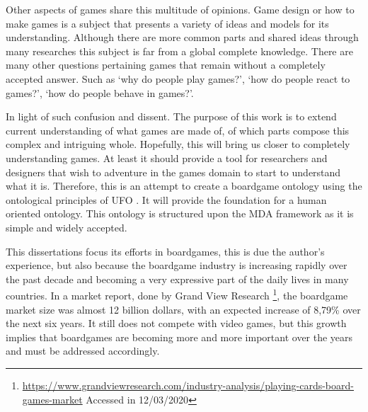 Other aspects of games share this multitude of opinions. Game design or how to make games is a subject that presents a variety of ideas and models for its understanding. Although there are more common parts and shared ideas through many researches this subject is far from a global complete knowledge. There are many other questions pertaining games that remain without a completely accepted answer. Such as `why do people play games?', `how do people react to games?', `how do people behave in games?'.

In light of such confusion and dissent. The purpose of this work is to extend current understanding of what games are made of, of which parts compose this complex and intriguing whole. Hopefully, this will bring us closer to completely understanding games. At least it should provide a tool for researchers and designers that wish to adventure in the games domain to start to understand what it is. Therefore, this is an attempt to create a boardgame ontology using the ontological principles of UFO \citep{guizzardi_ontological_2005}. It will provide the foundation for a human oriented ontology. This ontology is structured upon the MDA framework \citep{Hunicke2004} as it is simple and widely accepted. 

This dissertations focus its efforts in boardgames, this is due the author's experience, but also because the boardgame industry is increasing rapidly over the past decade and becoming a very expressive part of the daily lives in many countries. In a market report, done by Grand View Research \footnote{\url{https://www.grandviewresearch.com/industry-analysis/playing-cards-board-games-market} Accessed in 12/03/2020}, the boardgame market size was almost 12 billion dollars, with an expected increase of 8,79\% over the next six years. It still does not compete with video games, but this growth implies that boardgames are becoming more and more important over the years and must be addressed accordingly.